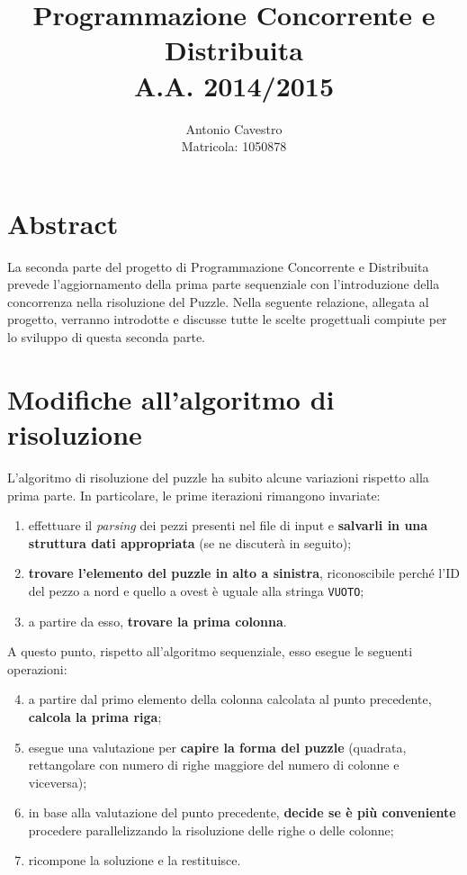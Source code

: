 \documentclass[a4paper, 12pt]{article}
\title{Programmazione Concorrente e Distribuita \\ A.A. 2014/2015 \\
\vspace{2 mm}{\small PuzzleSolver - Parte 2}}
\author{Antonio Cavestro \\ \vspace{2 mm} {\small Matricola: 1050878}}
\date{}
\newcommand{\strong}[1]{ \textbf{#1}}
\begin{document}
\maketitle

\section{Abstract}

La seconda parte del progetto di Programmazione Concorrente e Distribuita
prevede l'aggiornamento della prima parte sequenziale con l'introduzione della
concorrenza nella risoluzione del Puzzle.
Nella seguente relazione, allegata al progetto, verranno introdotte e discusse
tutte le scelte progettuali compiute per lo sviluppo di questa seconda parte.

\section{Modifiche all'algoritmo di risoluzione}

L'algoritmo di risoluzione del puzzle ha subito alcune variazioni rispetto alla
prima parte. In particolare, le prime iterazioni rimangono invariate:

\begin{enumerate}
\item effettuare il \emph{parsing} dei pezzi presenti nel file di input e
\strong{salvarli in una struttura dati appropriata} (se ne discuterà in seguito);
\item \strong{trovare l'elemento del puzzle in alto a sinistra}, riconoscibile
perché l'ID del pezzo a nord e quello a ovest è uguale alla stringa
\verb|VUOTO|;
\item a partire da esso, \strong{trovare la prima colonna}.
\end{enumerate}

A questo punto, rispetto all'algoritmo sequenziale, esso esegue le seguenti
operazioni:
\begin{enumerate}
\setcounter{enumi}{3}
\item a partire dal primo elemento della colonna calcolata al punto precedente,
\strong{calcola la prima riga};
\item esegue una valutazione per \strong{capire la forma del puzzle} (quadrata,
rettangolare con numero di righe maggiore del numero di colonne e viceversa);
\item in base alla valutazione del punto precedente, \strong{decide se è più conveniente} procedere parallelizzando la risoluzione delle righe o delle
colonne;
\item ricompone la soluzione e la restituisce.
\end{enumerate}
\end{document}

